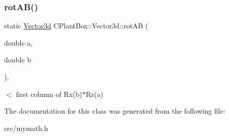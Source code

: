 \subsubsection{\texorpdfstring{rot\+A\+B()}{rotAB()}}
{\footnotesize\ttfamily static \hyperlink{classCPlantBox_1_1Vector3d}{Vector3d} C\+Plant\+Box\+::\+Vector3d\+::rot\+AB (\begin{DoxyParamCaption}\item[{double}]{a,  }\item[{double}]{b }\end{DoxyParamCaption})\hspace{0.3cm}{\ttfamily [inline]}, {\ttfamily [static]}}

$<$ first column of Rx(b)$\ast$\+Rz(a) 

The documentation for this class was generated from the following file\+:\begin{DoxyCompactItemize}
\item 
src/mymath.\+h\end{DoxyCompactItemize}
